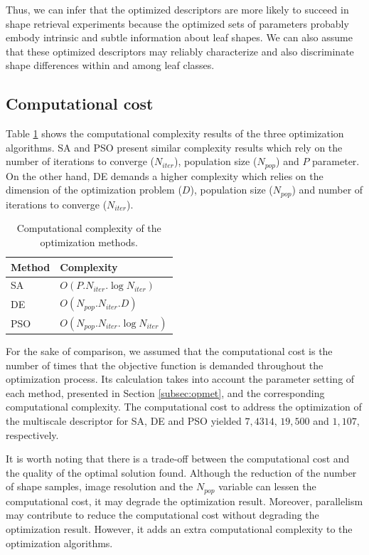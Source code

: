 {Thus, we can infer that the optimized descriptors are more likely to succeed in shape retrieval experiments because the optimized sets of parameters probably embody intrinsic and subtle information about leaf shapes. We can also assume that these optimized descriptors may reliably characterize and also discriminate shape differences within and among leaf classes. 

\subsection{Computational cost \label{sec:comp_cost}}

Table \ref{tbl:complexity} shows the computational complexity results of the three optimization algorithms. SA and PSO present similar complexity results which rely on the number of iterations to converge ($N_{iter}$), population size ($N_{pop}$) and $P$ parameter. On the other hand,  DE  demands a higher complexity which relies on the dimension of the optimization problem ($D$), population size ($N_{pop}$) and number of iterations to converge ($N_{iter}$).

\begin{table}[h!]
\centering
\caption{Computational complexity of the optimization methods.}
\label{tbl:complexity}
  \begin{tabular}{ll}
  \toprule[1.5pt]
 Method & Complexity\\
 \midrule
   SA  & $O(P.N_{iter}.\log{N_{iter}})$    \\
   DE  & $O(N_{pop}.N_{iter}.D)$   \\
   PSO&  $O(N_{pop}.N_{iter}.\log{N_{iter}})$\\
  \bottomrule[1.5pt]
  \end{tabular}
\end{table}

For the sake of comparison, we assumed that the computational cost is the number of times that the objective function is demanded throughout the optimization process. Its calculation takes into account the parameter setting of each method, presented in Section \ref{subsec:opmet}, and the corresponding computational complexity.  The computational cost to address the optimization of the multiscale descriptor for SA, DE and PSO yielded $7,4314$, $19,500$ and $1,107$, respectively. 

It is worth noting that there is a trade-off between the computational cost and the quality of the optimal solution found. Although the reduction of the number of shape samples, image resolution and the $N_{pop}$ variable can lessen the computational cost, it may degrade the optimization result. Moreover, parallelism may contribute to reduce the computational cost without degrading the optimization result.  However, it adds an extra computational complexity to the optimization algorithms.
}


